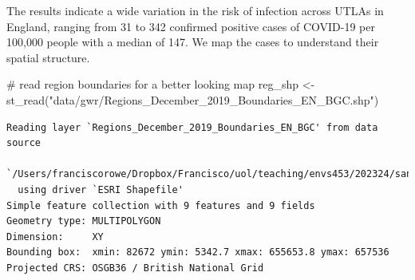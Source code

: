\documentclass[
  letterpaper,
  DIV=11,
  numbers=noendperiod,
  oneside]{scrreprt}
\newenvironment{Shaded}{\begin{snugshade}}{\end{snugshade}}
\newcommand{\CommentTok}[1]{\textcolor[rgb]{0.37,0.37,0.37}{#1}}
\newcommand{\FunctionTok}[1]{\textcolor[rgb]{0.28,0.35,0.67}{#1}}
\newcommand{\NormalTok}[1]{\textcolor[rgb]{0.00,0.23,0.31}{#1}}
\newcommand{\OtherTok}[1]{\textcolor[rgb]{0.00,0.23,0.31}{#1}}
\newcommand{\StringTok}[1]{\textcolor[rgb]{0.13,0.47,0.30}{#1}}
\begin{document}
The results indicate a wide variation in the risk of infection across
UTLAs in England, ranging from 31 to 342 confirmed positive cases of
COVID-19 per 100,000 people with a median of 147. We map the cases to
understand their spatial structure.

\begin{Shaded}
\begin{Highlighting}[]
\CommentTok{\# read region boundaries for a better looking map}
\NormalTok{reg\_shp }\OtherTok{\textless{}{-}} \FunctionTok{st\_read}\NormalTok{(}\StringTok{"data/gwr/Regions\_December\_2019\_Boundaries\_EN\_BGC.shp"}\NormalTok{)}
\end{Highlighting}
\end{Shaded}

\begin{verbatim}
Reading layer `Regions_December_2019_Boundaries_EN_BGC' from data source 
  `/Users/franciscorowe/Dropbox/Francisco/uol/teaching/envs453/202324/san/data/gwr/Regions_December_2019_Boundaries_EN_BGC.shp' 
  using driver `ESRI Shapefile'
Simple feature collection with 9 features and 9 fields
Geometry type: MULTIPOLYGON
Dimension:     XY
Bounding box:  xmin: 82672 ymin: 5342.7 xmax: 655653.8 ymax: 657536
Projected CRS: OSGB36 / British National Grid
\end{verbatim}
\end{document}
